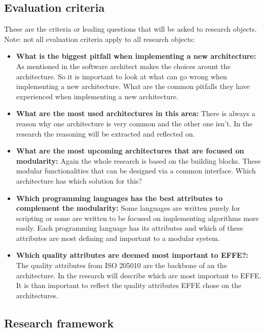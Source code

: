 \subsection{Evaluation criteria}
These are the criteria or leading questions that will be asked to research objects. Note: not all evaluation criteria apply to all research objects:

\begin{itemize}
	\item \textbf{What is the biggest pitfall when implementing a new architecture: }As mentioned in  the software architect makes the choices arount the architecture. So it is important to look at what can go wrong when implementing a new architecture. What are the common pitfalls they have experienced when implementing a new architecture.

	\item \textbf{What are the most used architectures in this area: }There is always a reason why one architecture is very common and the other one isn't. In the research the reasoning will be extracted and reflected on.

	\item \textbf{What are the most upcoming architectures that are focused on modularity: }Again the whole research is based on the building blocks. These modular functionalities that can be designed via a common interface. Which architecture has which solution for this?

	\item \textbf{Which programming languages has the best attributes to complement the modularity: }Some languages are written purely for scripting or some are written to be focused on implementing algorithms more easily. Each programming language has its attributes and which of these attributes are most defining and important to a modular system.

	\item \textbf{Which quality attributes are deemed most important to EFFE?: }The quality attributes from ISO 205010 \cite{iso25010} are the backbone of an the architecture. In the research will describe which are most important to EFFE. It is than important to reflect the quality attributes EFFE chose on the architectures.
\end{itemize}

\subsection{Research framework}

